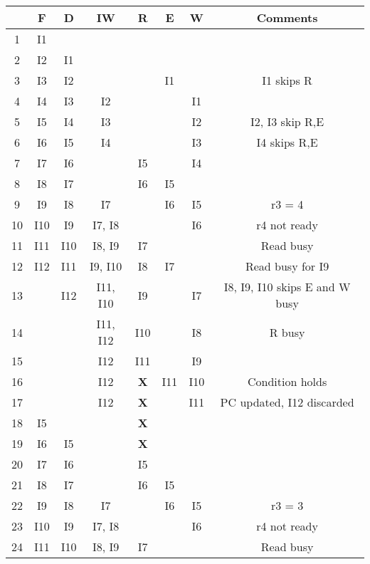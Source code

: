 \documentclass[12pt]{article}
\begin{document}
\begin{enumerate}
\begin{enumerate}
            \begin{table}[h!]
            \centering
            \begin{tabular}{||c||c|c|c|c|c|c|c||} 
             \hline
              & F & D & IW & R & E & W & Comments\\ [0.5ex] 
             \hline\hline
             1 & I1 & & & & & & \\ 
             2 & I2 & I1 & & & & &  \\
             3 & I3 & I2 & & & I1 & & I1 skips R\\
             4 & I4 & I3 & I2 & & & I1 & \\
             5 & I5 & I4 & I3 & & & I2 & I2, I3 skip R,E\\  
             6 & I6 & I5 & I4 & & & I3 & I4 skips R,E\\
             7 & I7 & I6 & & I5 & & I4 & \\
             8 & I8 & I7 & & I6 & I5 & & \\
             9 & I9 & I8 & I7 & & I6 & I5 & r3 = 4\\
             10 & I10 & I9 & I7, I8 & & & I6 & r4 not ready\\
             11 & I11 & I10 & I8, I9 & I7 & & & Read busy\\
             12 & I12 & I11 & I9, I10 & I8 & I7 & & Read busy for I9\\
             13 & & I12 & I11, I10 & I9 & & I7 & I8, I9, I10 skips E and W busy\\
             14 & & & I11, I12 & I10 & & I8 & R busy\\
             15 & & & I12 & I11 & & I9 & \\
             16 & & & I12 & \textbf{X} & I11 & I10 & Condition holds\\
             17 & & & I12 & \textbf{X} & & I11 & PC updated, I12 discarded\\
             18 & I5 & & & \textbf{X} & & & \\
             19 & I6 & I5 & & \textbf{X} & & & \\
             20 & I7 & I6 & & I5 & & & \\
             21 & I8 & I7 & & I6 & I5 & & \\
             22 & I9 & I8 & I7 & & I6 & I5 & r3 = 3\\
             23 & I10 & I9 & I7, I8 & & & I6 & r4 not ready\\
             24 & I11 & I10 & I8, I9 & I7 & & & Read busy\\

\end{tabular}
\end{table}
\end{enumerate}
\end{enumerate}
\end{document}
